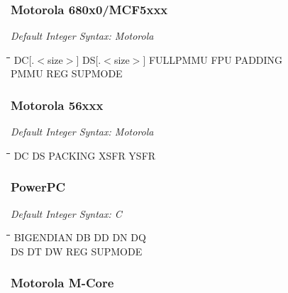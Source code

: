  \subsubsection{Motorola 680x0/MCF5xxx}

{\em Default Integer Syntax: Motorola}

{\tt\begin{tabbing}
\hspace{3cm}\=\hspace{3cm}\=\hspace{3cm}\=\hspace{3cm}\=\kill
DC[.$<$size$>$]\> DS[.$<$size$>$] \> FULLPMMU    \> FPU         \> PADDING \\
PMMU       \> REG         \> SUPMODE \\
\end{tabbing}}

\subsubsection{Motorola 56xxx}

{\em Default Integer Syntax: Motorola}

{\tt\begin{tabbing}
\hspace{3cm}\=\hspace{3cm}\=\hspace{3cm}\=\hspace{3cm}\=\kill
DC         \> DS          \> PACKING     \> XSFR        \> YSFR \\
\end{tabbing}}

\subsubsection{PowerPC}

{\em Default Integer Syntax: C}

{\tt\begin{tabbing}
\hspace{3cm}\=\hspace{3cm}\=\hspace{3cm}\=\hspace{3cm}\=\kill
BIGENDIAN  \> DB          \> DD          \> DN          \> DQ \\
DS         \> DT          \> DW          \> REG         \> SUPMODE \\
\end{tabbing}}

\subsubsection{Motorola M-Core}

